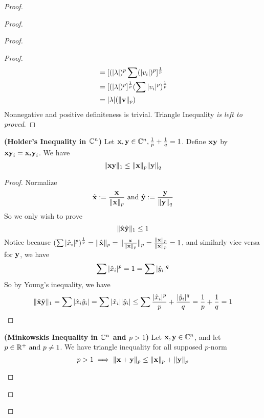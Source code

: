 \documentclass{report}
\begin{document}
\begin{proof}
\begin{proof}
\begin{proof}
\begin{proof}
\begin{align}
&=[(|\lambda |)^p\sum (|v_i|)^p]^{\frac{1}{p}}\\
&=[(|\lambda |)^p]^{\frac{1}{p}}(\sum |v_i|^p)^{\frac{1}{p}}\\
&=|\lambda |(\| \textbf{v} \|_p)
\end{align}
Nonnegative and positive definiteness is trivial. Triangle Inequality \textit{is left to proved}. 
\end{proof}
\begin{theorem}
\label{6.1.3}
\textbf{(Holder's Inequality in $\mathbb{C}^n$)} Let $\textbf{x},\textbf{y}\in \mathbb{C}^n,\frac{1}{p}+\frac{1}{q}=1$. Define $\textbf{xy}$ by $\textbf{xy}_i=\textbf{x}_i\textbf{y}_i$. We have
\begin{equation}
\| \textbf{xy} \|_1\leq \| \textbf{x} \|_p\| \textbf{y} \|_q
\end{equation}
\end{theorem}
\begin{proof}
Normalize 
\begin{equation}
\hat{\textbf{x}}:= \frac{\textbf{x}}{\| \textbf{x} \|_p}\text{ and }\hat{\textbf{y}}:=\frac{\textbf{y}}{\| \textbf{y} \|_q}
\end{equation}
So we only wish to prove
\begin{equation}
\| \hat{\textbf{x}}\hat{\textbf{y}} \|_1\leq 1 
\end{equation}
Notice because $(\sum |\hat{x}_i|^p)^{\frac{1}{p}}=\| \hat{\textbf{x}} \|_p=\| \frac{\textbf{x}}{\| \textbf{x} \|_p} \|_p=\frac{\| \textbf{x} \|_p}{\| \textbf{x} \|_p}=1$, and similarly vice versa for $\textbf{y}$, we have \begin{equation}
\sum |\hat{x}_i|^p=1=\sum |\hat{y}_i|^q \end{equation} So by Young's inequality, we have \begin{equation} \| \hat{\textbf{x}}\hat{\textbf{y}} \|_1= \sum |\hat{x }_i\hat{y}_i|=\sum |\hat{x}_i||\hat{y}_i|\leq \sum \frac{|\hat{x}_i|^p}{p}+\frac{|\hat{y}_i|^q}{q}=\frac{1}{p}+\frac{1}{q}=1
\end{equation}
\end{proof}
\begin{corollary}
\label{6.1.4}
\textbf{(Minkowskis Inequality in $\mathbb{C}^n$ and $p>1$)} Let $\textbf{x},\textbf{y}\in\mathbb{C}^n$, and let $p\in \mathbb{R}^+\text{ and }p\neq 1$. We have triangle inequality for all supposed $p$-norm
\begin{equation}
p>1\implies  \| \textbf{x}+\textbf{y} \|_p\leq \| \textbf{x} \|_p+\| \textbf{y} \|_p
\end{equation}

\end{corollary}
\end{proof}
\end{proof}
\end{proof}
\end{document}
